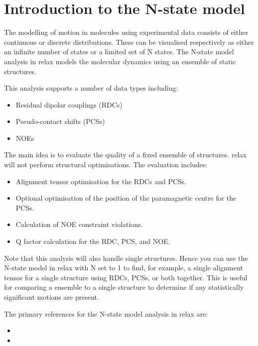 
\section{Introduction to the N-state model}

The modelling of motion in molecules using experimental data consists of either continuous or discrete distributions.
These can be visualised respectively as either an infinite number of states or a limited set of N states.
The N-state model analysis in relax models the molecular dynamics using an ensemble of static structures.

This analysis supports a number of data types including:
\begin{itemize}
\item Residual dipolar couplings (RDCs)
\item Pseudo-contact shifts (PCSs)
\item NOEs
\end{itemize}

The main idea is to evaluate the quality of a fixed ensemble of structures.
relax will not perform structural optimisations.
The evaluation includes:
\begin{itemize}
\item Alignment tensor optimisation for the RDCs and PCSs.
\item Optional optimisation of the position of the paramagnetic centre for the PCSs.
\item Calculation of NOE constraint violations.
\item Q factor calculation for the RDC, PCS, and NOE.
\end{itemize}

Note that this analysis will also handle single structures.
Hence you can use the N-state model in relax with N set to 1 to find, for example, a single alignment tensor for a single structure using RDCs, PCSs, or both together.
This is useful for comparing a ensemble to a single structure to determine if any statistically significant motions are present.

The primary references for the N-state model analysis in relax are:
\begin{itemize}
  \item {}
  \item {}
\end{itemize}



